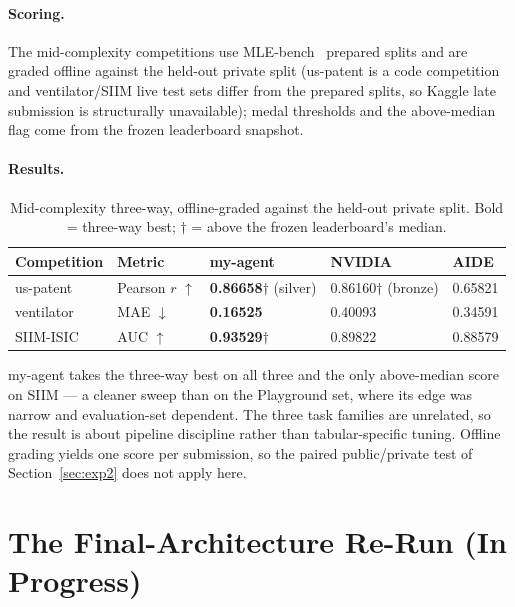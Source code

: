 \documentclass[11pt,a4paper]{article}
\newcommand{\dn}{\ensuremath{\downarrow}}
\newcommand{\up}{\ensuremath{\uparrow}}
\begin{document}
\paragraph{Scoring.} The mid-complexity competitions use MLE-bench~\cite{mlebench} prepared splits and are graded offline against the held-out private split (us-patent is a code competition and ventilator/SIIM live test sets differ from the prepared splits, so Kaggle late submission is structurally unavailable); medal thresholds and the above-median flag come from the frozen leaderboard snapshot.

\paragraph{Results.}
\begin{table}[H]
\centering\small
\caption{Mid-complexity three-way, offline-graded against the held-out private split. Bold = three-way best; $\dagger$ = above the frozen leaderboard's median.}
\begin{tabular}{@{}lllll@{}}
\toprule
\textbf{Competition} & \textbf{Metric} & \textbf{my-agent} & \textbf{NVIDIA} & \textbf{AIDE} \\
\midrule
us-patent & Pearson $r$ \up & \textbf{0.86658}$\dagger$ (silver) & 0.86160$\dagger$ (bronze) & 0.65821 \\
ventilator & MAE \dn & \textbf{0.16525} & 0.40093 & 0.34591 \\
SIIM-ISIC & AUC \up & \textbf{0.93529}$\dagger$ & 0.89822 & 0.88579 \\
\bottomrule
\end{tabular}
\end{table}

my-agent takes the three-way best on all three and the only above-median score on SIIM --- a cleaner sweep than on the Playground set, where its edge was narrow and evaluation-set dependent. The three task families are unrelated, so the result is about pipeline discipline rather than tabular-specific tuning. Offline grading yields one score per submission, so the paired public/private test of Section~\ref{sec:exp2} does not apply here.

\section{The Final-Architecture Re-Run (In Progress)}
\label{sec:rerun}
\end{document}
